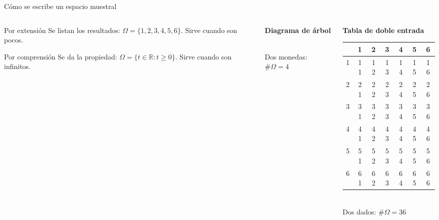 \documentclass[aspectratio=169,10pt]{beamer}
\begin{document}
\begin{frame}{Cómo se escribe un espacio muestral}
  \tiny
  \begin{columns}[T,onlytextwidth]
    \begin{column}{0.30\textwidth}
      \begin{block}{Por extensión}
        \tiny
        Se listan los resultados:
        $\Omega = \{1,2,3,4,5,6\}$. Sirve cuando son pocos.
      \end{block}
      \begin{block}{Por comprensión}
        \tiny
        Se da la propiedad:
        $\Omega = \{t \in \mathbb{R} : t \ge 0\}$. Sirve cuando son
        infinitos.
      \end{block}
    \end{column}
    \begin{column}{0.32\textwidth}
      \centering
      {\tiny\color{uniAzul}\textbf{Diagrama de árbol}}\\[0.15em]
      \\[0.1em]
      {\tiny Dos monedas: $\#\Omega = 4$}
    \end{column}
    \begin{column}{0.34\textwidth}
      \centering
      {\tiny\color{uniAzul}\textbf{Tabla de doble entrada}}\\[0.15em]
      \tiny
      \setlength{\tabcolsep}{2.0pt}
      \renewcommand{\arraystretch}{0.82}
      \begin{tabular}{@{}c|cccccc@{}}
        & 1 & 2 & 3 & 4 & 5 & 6 \\
        \hline
        1 & 11 & 12 & 13 & 14 & 15 & 16 \\
        2 & 21 & 22 & 23 & 24 & 25 & 26 \\
        3 & 31 & 32 & 33 & 34 & 35 & 36 \\
        4 & 41 & 42 & 43 & 44 & 45 & 46 \\
        5 & 51 & 52 & 53 & 54 & 55 & 56 \\
        6 & 61 & 62 & 63 & 64 & 65 & 66 \\
      \end{tabular}\\[0.05em]
      {\tiny Dos dados: $\#\Omega = 36$}
    \end{column}
  \end{columns}


\end{frame}
\end{document}
